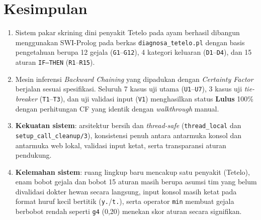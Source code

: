 \documentclass[12pt,a4paper]{report}
\begin{document}
\section{Kesimpulan}
\begin{enumerate}
  \item Sistem pakar skrining dini penyakit Tetelo pada ayam berhasil dibangun menggunakan SWI-Prolog pada berkas \texttt{diagnosa\_tetelo.pl} dengan basis pengetahuan berupa 12 gejala (\texttt{G1}--\texttt{G12}), 4 kategori keluaran (\texttt{D1}--\texttt{D4}), dan 15 aturan \texttt{IF--THEN} (\texttt{R1}--\texttt{R15}).
  \item Mesin inferensi \textit{Backward Chaining} yang dipadukan dengan \textit{Certainty Factor} berjalan sesuai spesifikasi. Seluruh 7 kasus uji utama (\texttt{U1}--\texttt{U7}), 3 kasus uji \textit{tie-breaker} (\texttt{T1}--\texttt{T3}), dan uji validasi input (\texttt{V1}) menghasilkan status \textbf{Lulus} 100\% dengan perhitungan CF yang identik dengan \textit{walkthrough} manual.
  \item \textbf{Kekuatan sistem}: arsitektur bersih dan \textit{thread-safe} (\texttt{thread\_local} dan \texttt{setup\_call\_cleanup/3}), konsistensi penuh antara antarmuka konsol dan antarmuka web lokal, validasi input ketat, serta transparansi aturan pendukung.
  \item \textbf{Kelemahan sistem}: ruang lingkup baru mencakup satu penyakit (Tetelo), enam bobot gejala dan bobot 15 aturan masih berupa asumsi tim yang belum divalidasi dokter hewan secara langsung, input konsol masih ketat pada format huruf kecil bertitik (\texttt{y.}/\texttt{t.}), serta operator \texttt{min} membuat gejala berbobot rendah seperti \texttt{g4} (0,20) menekan skor aturan secara signifikan.
\end{enumerate}
\end{document}
